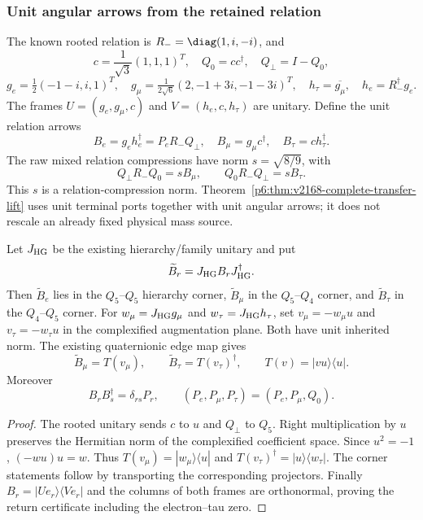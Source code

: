\documentclass[12pt,a4paper]{article}
\begin{document}
\subsubsection{Unit angular arrows from the retained relation}
The known rooted relation is $R_-=\diag(1,i,-i)$, and
\[
 c=\frac1{\sqrt3}(1,1,1)^T,\quad Q_0=cc^\dagger,\quad Q_\perp=I-Q_0,
\]
\[
 g_e=\tfrac12(-1-i,i,1)^T,\quad
 g_\mu=\tfrac1{2\sqrt6}(2,-1+3i,-1-3i)^T,\quad
 h_\tau=\overline{g_\mu},\quad h_e=R_-^\dagger g_e.
\]
The frames $U=(g_e,g_\mu,c)$ and $V=(h_e,c,h_\tau)$ are unitary.
Define the unit relation arrows
\[
 B_e=g_eh_e^\dagger=P_eR_-Q_\perp,
 \quad B_\mu=g_\mu c^\dagger,
 \quad B_\tau=c h_\tau^\dagger.
\]
The raw mixed relation compressions have norm $s=\sqrt{8/9}$, with
\[
 Q_\perp R_-Q_0=sB_\mu,\qquad
 Q_0R_-Q_\perp=sB_\tau.
\]
This $s$ is a relation-compression norm. Theorem~\ref{p6:thm:v2168-complete-transfer-lift} uses
unit terminal ports together with unit angular arrows; it does not rescale an
already fixed physical mass source.

\begin{proposition}
\label{p6:prop:v2168-angular-hierarchy}
Let $J_{\rm HG}$ be the existing hierarchy/family unitary and put
\[
 \widetilde B_r=J_{\rm HG}B_rJ_{\rm HG}^\dagger.
\]
Then $\widetilde B_e$ lies in the $Q_5$--$Q_5$ hierarchy corner,
$\widetilde B_\mu$ in the $Q_5$--$Q_4$ corner, and
$\widetilde B_\tau$ in the $Q_4$--$Q_5$ corner.
For $w_\mu=J_{\rm HG}g_\mu$ and $w_\tau=J_{\rm HG}h_\tau$, set
$v_\mu=-w_\mu u$ and $v_\tau=-w_\tau u$ in the complexified augmentation
plane. Both have unit inherited norm. The existing quaternionic edge map gives
\[
 \boxed{\widetilde B_\mu=T(v_\mu),\qquad
 \widetilde B_\tau=T(v_\tau)^\dagger,\qquad
 T(v)=|vu\rangle\langle u|.}
\]
Moreover
\[
 \boxed{B_rB_s^\dagger=\delta_{rs}P_r,
 \qquad (P_e,P_\mu,P_\tau)=(P_e,P_\mu,Q_0).}
\]
\end{proposition}
\begin{proof}
The rooted unitary sends $c$ to $u$ and $Q_\perp$ to $Q_5$.
Right multiplication by $u$ preserves the Hermitian norm of the
complexified coefficient space. Since $u^2=-1$,
$(-w u)u=w$. Thus $T(v_\mu)=|w_\mu\rangle\langle u|$ and
$T(v_\tau)^\dagger=|u\rangle\langle w_\tau|$.
The corner statements follow by transporting the corresponding projectors.
Finally $B_r=|Ue_r\rangle\langle Ve_r|$ and the columns of both frames are
orthonormal, proving the return certificate including the electron--tau zero.
\end{proof}
\end{document}
